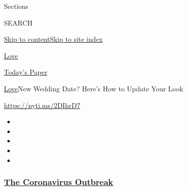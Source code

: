 Sections

SEARCH

\protect\hyperlink{site-content}{Skip to
content}\protect\hyperlink{site-index}{Skip to site index}

\href{https://www.nytimes3xbfgragh.onion/section/fashion/weddings}{Love}

\href{https://myaccount.nytimes3xbfgragh.onion/auth/login?response_type=cookie\&client_id=vi}{}

\href{https://www.nytimes3xbfgragh.onion/section/todayspaper}{Today's
Paper}

\href{/section/fashion/weddings}{Love}\textbar{}New Wedding Date? Here's
How to Update Your Look

\url{https://nyti.ms/2DIhrD7}

\begin{itemize}
\item
\item
\item
\item
\item
\end{itemize}

\hypertarget{the-coronavirus-outbreak}{%
\subsubsection{\texorpdfstring{\href{https://www.nytimes3xbfgragh.onion/news-event/coronavirus?name=styln-coronavirus-national\&region=TOP_BANNER\&block=storyline_menu_recirc\&action=click\&pgtype=Article\&impression_id=9b415ff0-f280-11ea-9229-6716eea12c6f\&variant=undefined}{The
Coronavirus
Outbreak}}{The Coronavirus Outbreak}}\label{the-coronavirus-outbreak}}

